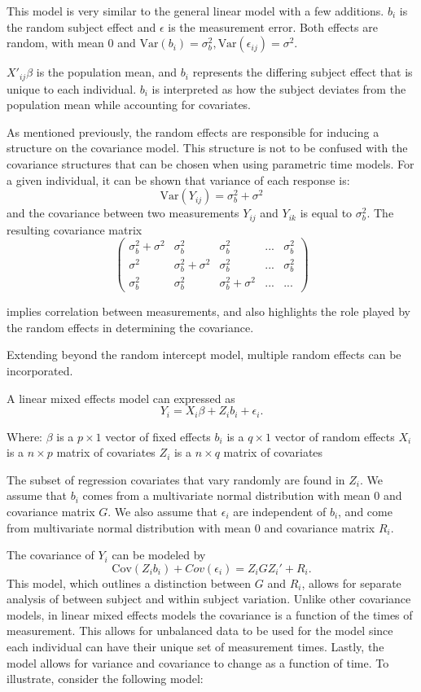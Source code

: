 \documentclass[12pt, twoside]{amherstthesis}
\begin{document}
This model is very similar to the general linear model with a few additions. \(b_i\) is the random subject effect and \(\epsilon\) is the measurement error. Both effects are random, with mean 0 and \(\text{Var}(b_i) = \sigma^2_b, \text{Var}(\epsilon_{ij})=\sigma^2\).

\(X'_{ij}\beta\) is the population mean, and \(b_i\) represents the differing subject effect that is unique to each individual. \(b_i\) is interpreted as how the subject deviates from the population mean while accounting for covariates.

As mentioned previously, the random effects are responsible for inducing a structure on the covariance model. This structure is not to be confused with the covariance structures that can be chosen when using parametric time models. For a given individual, it can be shown that variance of each response is:
\[\text{Var}(Y_{ij}) = \sigma^2_b + \sigma^2\] and the covariance between two measurements \(Y_{ij}\) and \(Y_{ik}\) is equal to \(\sigma^2_b\). The resulting covariance matrix \[\begin{pmatrix} \sigma^2_b + \sigma^2 & \sigma^2_b & \sigma^2_b & ... & \sigma^2_b \\ \sigma^2 & \sigma^2_b + \sigma^2 & \sigma^2_b & ... & \sigma^2_b \\ \sigma^2_b & \sigma^2_b & \sigma^2_b + \sigma^2 & ...& ...   \end{pmatrix}\]

implies correlation between measurements, and also highlights the role played by the random effects in determining the covariance.

Extending beyond the random intercept model, multiple random effects can be incorporated.

A linear mixed effects model can expressed as \[Y_i = X_i\beta+Z_ib_i+\epsilon_i.\]

Where:
\(\beta\) is a \(p \times 1\) vector of fixed effects
\(b_i\) is a \(q \times 1\) vector of random effects
\(X_i\) is a \(n \times p\) matrix of covariates
\(Z_i\) is a \(n \times q\) matrix of covariates

The subset of regression covariates that vary randomly are found in \(Z_i\). We assume that \(b_i\) comes from a multivariate normal distribution with mean 0 and covariance matrix \(G\). We also assume that \(\epsilon_i\) are independent of \(b_i\), and come from multivariate normal distribution with mean 0 and covariance matrix \(R_i\).

The covariance of \(Y_i\) can be modeled by \[\text{Cov}(Z_ib_i) + Cov(\epsilon_i) = Z_iGZ_i' + R_i.\] This model, which outlines a distinction between \(G\) and \(R_i\), allows for separate analysis of between subject and within subject variation. Unlike other covariance models, in linear mixed effects models the covariance is a function of the times of measurement. This allows for unbalanced data to be used for the model since each individual can have their unique set of measurement times. Lastly, the model allows for variance and covariance to change as a function of time. To illustrate, consider the following model:
\end{document}
